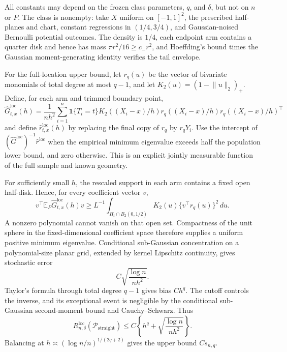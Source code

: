All constants may depend on the frozen class parameters, \(q\), and \(\delta\), but not on \(n\) or \(P\).  The class is nonempty: take \(X\) uniform on \([-1,1]^2\), the prescribed half-planes and chart, constant regressions in \((1/4,3/4)\), and Gaussian-noised Bernoulli potential outcomes.  The density is \(1/4\), each endpoint arm contains a quarter disk and hence has mass \(\pi r^2/16\geq c_-r^2\), and Hoeffding's bound times the Gaussian moment-generating identity verifies the tail envelope.

For the full-location upper bound, let \(r_q(u)\) be the vector of bivariate monomials of total degree at most \(q-1\), and let \(K_2(u)=(1-\lVert u\rVert_2)_+\).  Define, for each arm and trimmed boundary point,
\[
 \widehat G^{\mathrm{loc}}_{t,x}(h)=\frac1{nh^2}\sum_{i=1}^n
 \mathbf1\{T_i=t\}K_2((X_i-x)/h)
 r_q((X_i-x)/h)r_q((X_i-x)/h)^\top
\]
and define \(\widehat r^{\mathrm{loc}}_{t,x}(h)\) by replacing the final copy of \(r_q\) by \(r_qY_i\).  Use the intercept of \((\widehat G^{\mathrm{loc}})^{-1}\widehat r^{\mathrm{loc}}\) when the empirical minimum eigenvalue exceeds half the population lower bound, and zero otherwise.  This is an explicit jointly measurable function of the full sample and known geometry.

For sufficiently small \(h\), the rescaled support in each arm contains a fixed open half-disk.  Hence, for every coefficient vector \(v\),
\[
 v^\top\mathbb E_P\widehat G^{\mathrm{loc}}_{t,x}(h)v
 \geq L^{-1}\int_{H_t\cap B_2(0,1/2)}K_2(u)
 \{v^\top r_q(u)\}^2\,du.
\]
A nonzero polynomial cannot vanish on that open set.  Compactness of the unit sphere in the fixed-dimensional coefficient space therefore supplies a uniform positive minimum eigenvalue.  Conditional sub-Gaussian concentration on a polynomial-size planar grid, extended by kernel Lipschitz continuity, gives stochastic error
\[
 C\sqrt{\frac{\log n}{nh^2}}.
\]
Taylor's formula through total degree \(q-1\) gives bias \(Ch^q\).  The cutoff controls the inverse, and its exceptional event is negligible by the conditional sub-Gaussian second-moment bound and Cauchy--Schwarz.  Thus
\[
 R_{n,\delta}^{\mathrm{loc}}(\mathcal P_{\mathrm{straight}})
 \leq C\left\{h^q+\sqrt{\frac{\log n}{nh^2}}\right\}.
\]
Balancing at \(h\asymp(\log n/n)^{1/(2q+2)}\) gives the upper bound \(Cs_{n,q}\).

